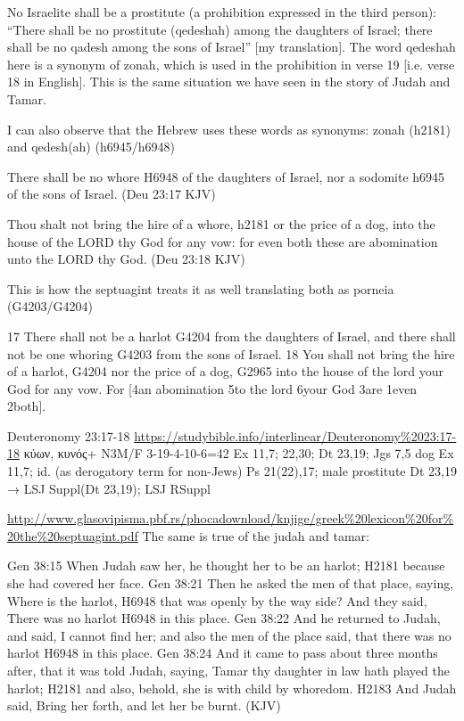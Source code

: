 \documentclass[11pt]{article}
\begin{document}
{No Israelite shall be a prostitute (a prohibition expressed in the third person): “There shall be no prostitute (qedeshah) among the daughters of Israel; there shall be no qadesh among the sons of Israel” [my translation]. The word qedeshah here is a synonym of zonah, which is used in the prohibition in verse 19 [i.e. verse 18 in English]. This is the same situation we have seen in the story of Judah and Tamar.

I can also observe that the Hebrew uses these words as synonyms: zonah (h2181) and qedesh(ah) (h6945/h6948)

There shall be no whore H6948 of the daughters of Israel, nor a sodomite h6945 of the sons of Israel. (Deu 23:17 KJV)

Thou shalt not bring the hire of a whore, h2181 or the price of a dog, into the house of the LORD thy God for any vow: for even both these are abomination unto the LORD thy God. (Deu 23:18 KJV)

This is how the septuagint treats it as well translating both as porneia (G4203/G4204)

17 There shall not be a harlot G4204 from the daughters of Israel, and there shall not be one whoring G4203 from the sons of Israel. 18 You shall not bring the hire of a harlot, G4204 nor the price of a dog, G2965 into the house of the lord your God for any vow. For [4an abomination 5to the lord 6your God 3are 1even 2both].

Deuteronomy 23:17-18 \url{https://studybible.info/interlinear/Deuteronomy%2023:17-18}
κύων, κυνός+ N3M/F 3-19-4-10-6=42
Ex 11,7; 22,30; Dt 23,19; Jgs 7,5
dog Ex 11,7; id. (as derogatory term for non-Jews) Ps 21(22),17; male prostitute Dt 23,19 
→ LSJ Suppl(Dt 23,19); LSJ RSuppl 

\url{http://www.glasovipisma.pbf.rs/phocadownload/knjige/greek%20lexicon%20for%20the%20septuagint.pdf}
The same is true of the judah and tamar:

Gen 38:15
When Judah saw her, he thought her to be an harlot; H2181 because she had covered her face.
Gen 38:21
Then he asked the men of that place, saying, Where is the harlot, H6948 that was openly by the way side? And they said, There was no harlot H6948 in this place.
Gen 38:22
And he returned to Judah, and said, I cannot find her; and also the men of the place said, that there was no harlot H6948 in this place.
Gen 38:24
And it came to pass about three months after, that it was told Judah, saying, Tamar thy daughter in law hath played the harlot; H2181 and also, behold, she is with child by whoredom. H2183 And Judah said, Bring her forth, and let her be burnt. (KJV)

}
\end{document}
